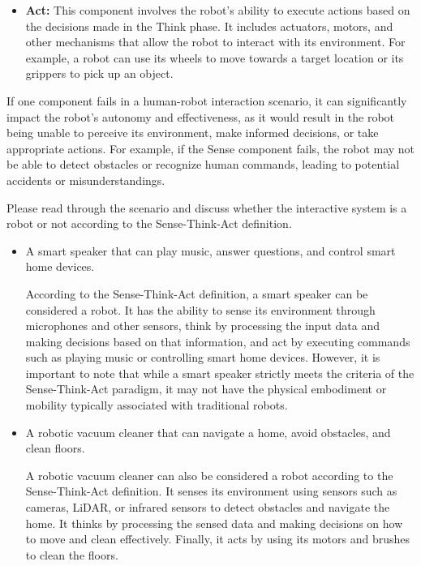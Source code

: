 \begin{ejercicio}
\begin{itemize}
        \item \textbf{Act:} This component involves the robot's ability to execute actions based on the decisions made in the Think phase. It includes actuators, motors, and other mechanisms that allow the robot to interact with its environment. For example, a robot can use its wheels to move towards a target location or its grippers to pick up an object.
    \end{itemize}

    If one component fails in a human-robot interaction scenario, it can significantly impact the robot's autonomy and effectiveness, as it would result in the robot being unable to perceive its environment, make informed decisions, or take appropriate actions. For example, if the Sense component fails, the robot may not be able to detect obstacles or recognize human commands, leading to potential accidents or misunderstandings.
\end{ejercicio}

\begin{ejercicio}
    Please read through the scenario and discuss whether the interactive system is a robot or not according to the Sense-Think-Act definition.
    \begin{itemize}
        \item A smart speaker that can play music, answer questions, and control smart home devices.
        
        According to the Sense-Think-Act definition, a smart speaker can be considered a robot. It has the ability to sense its environment through microphones and other sensors, think by processing the input data and making decisions based on that information, and act by executing commands such as playing music or controlling smart home devices. However, it is important to note that while a smart speaker strictly meets the criteria of the Sense-Think-Act paradigm, it may not have the physical embodiment or mobility typically associated with traditional robots.

        \item A robotic vacuum cleaner that can navigate a home, avoid obstacles, and clean floors.
        
        A robotic vacuum cleaner can also be considered a robot according to the Sense-Think-Act definition. It senses its environment using sensors such as cameras, LiDAR, or infrared sensors to detect obstacles and navigate the home. It thinks by processing the sensed data and making decisions on how to move and clean effectively. Finally, it acts by using its motors and brushes to clean the floors.
    \end{itemize}
\end{ejercicio}

